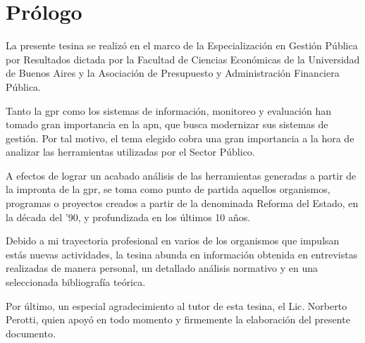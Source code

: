 \newpage

\section*{Prólogo}
La presente tesina se realizó en el marco de la Especialización en Gestión Pública por Resultados dictada por la Facultad de Ciencias Económicas de la Universidad de Buenos Aires y la Asociación de Presupuesto y Administración Financiera Pública.

Tanto la \ac{gpr} como los sistemas de información, monitoreo y evaluación han tomado gran importancia en la \ac{apn}, que busca modernizar sus sistemas de gestión. Por tal motivo, el tema elegido cobra una gran importancia a la hora de analizar las herramientas utilizadas por el Sector Público.

A efectos de lograr un acabado análisis de las herramientas generadas a partir de la impronta de la \ac{gpr}, se toma como punto de partida aquellos organismos, programas o proyectos creados a partir de la denominada Reforma del Estado, en la década del '90, y profundizada en los últimos 10 años.

Debido a mi trayectoria profesional en varios de los organismos que impulsan estás nuevas actividades, la tesina abunda en información obtenida en entrevistas realizadas de manera personal, un detallado análisis normativo y en una seleccionada bibliografía teórica.

Por último, un especial agradecimiento al tutor de esta tesina, el Lic. Norberto Perotti, quien apoyó en todo momento y firmemente la elaboración del presente documento.